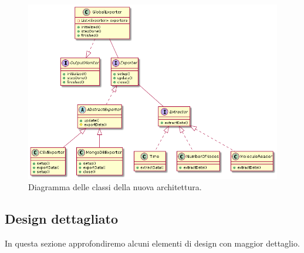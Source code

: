 \documentclass[12pt,a4paper,openright,oneside]{book}
\begin{document}
\begin{figure}
	\centering
	\includegraphics[width=1\linewidth]{images/alchemist-export-new.png}
	\caption{Diagramma delle classi della nuova architettura.}
	\label{fig:uml-global-arch}
\end{figure}

\subsection{Design dettagliato}
In questa sezione approfondiremo alcuni elementi di design con maggior dettaglio.
\end{document}
